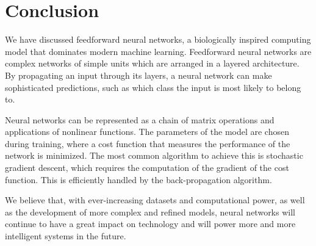 \section{Conclusion}
\label{sec:conclusion}
We have discussed feedforward neural networks, a biologically inspired computing model that dominates modern machine learning. Feedforward neural networks are complex networks of simple units which are arranged in a layered architecture. By propagating an input through its layers, a neural network can make sophisticated predictions, such as which class the input is most likely to belong to.

Neural networks can be represented as a chain of matrix operations and applications of nonlinear functions. The parameters of the model are chosen during training, where a cost function that measures the performance of the network is minimized. The most common algorithm to achieve this is stochastic gradient descent, which requires the computation of the gradient of the cost function. This is efficiently handled by the back-propagation algorithm.

\begin{comment}
Deep learning, the branch of machine learning that is concerned with the development of deep neural networks, has enabled an outstanding amount of advances in the field. 
\end{comment}
We believe that, with ever-increasing datasets and computational power, as well as the development of more complex and refined models, neural networks will continue to have a great impact on technology and will power more and more intelligent systems in the future.